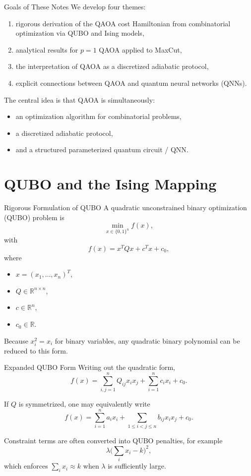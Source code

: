 \documentclass[aspectratio=169]{beamer}
\begin{document}
\begin{frame}{Goals of These Notes}
We develop four themes:
\begin{enumerate}
    \item rigorous derivation of the QAOA cost Hamiltonian from combinatorial
          optimization via QUBO and Ising models,
    \item analytical results for \(p=1\) QAOA applied to MaxCut,
    \item the interpretation of QAOA as a discretized adiabatic protocol,
    \item explicit connections between QAOA and quantum neural networks (QNNs).
\end{enumerate}

\medskip
The central idea is that QAOA is simultaneously:
\begin{itemize}
    \item an optimization algorithm for combinatorial problems,
    \item a discretized adiabatic protocol,
    \item and a structured parameterized quantum circuit / QNN.
\end{itemize}
\end{frame}

\section{QUBO and the Ising Mapping}

\begin{frame}{Rigorous Formulation of QUBO}
A quadratic unconstrained binary optimization (QUBO) problem is
\[
\min_{x\in\{0,1\}^n} f(x),
\]
with
\[
f(x)=x^T Q x + c^T x + c_0,
\]
where
\begin{itemize}
    \item \(x=(x_1,\dots,x_n)^T\),
    \item \(Q\in\mathbb{R}^{n\times n}\),
    \item \(c\in\mathbb{R}^n\),
    \item \(c_0\in\mathbb{R}\).
\end{itemize}

Because \(x_i^2=x_i\) for binary variables, any quadratic binary polynomial
can be reduced to this form.
\end{frame}

\begin{frame}{Expanded QUBO Form}
Writing out the quadratic form,
\[
f(x)=\sum_{i,j=1}^n Q_{ij}x_i x_j + \sum_{i=1}^n c_i x_i + c_0.
\]

If \(Q\) is symmetrized, one may equivalently write
\[
f(x)=\sum_{i=1}^n a_i x_i + \sum_{1\le i<j\le n} b_{ij} x_i x_j + c_0.
\]

Constraint terms are often converted into QUBO penalties, for example
\[
\lambda\Big(\sum_i x_i - k\Big)^2,
\]
which enforces \(\sum_i x_i \approx k\) when \(\lambda\) is sufficiently large.
\end{frame}
\end{document}
